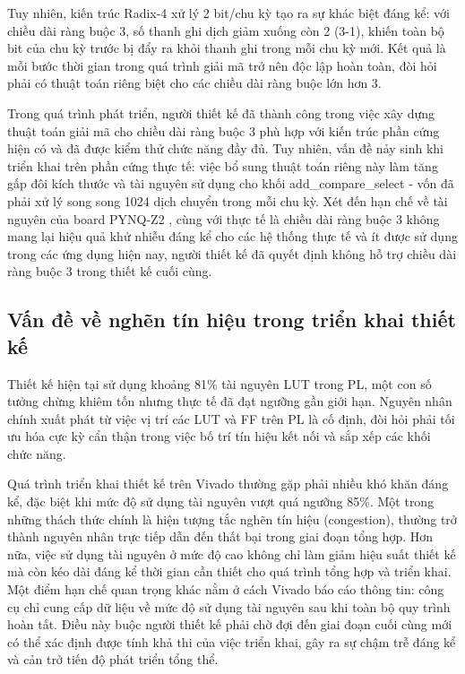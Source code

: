 \documentclass[../DoAn.tex]{subfiles}
\begin{document}
Tuy nhiên, kiến trúc Radix-4 xử lý 2 bit/chu kỳ tạo ra sự khác biệt đáng kể: với chiều dài ràng buộc 3, số thanh ghi dịch giảm xuống còn 2 (3-1), khiến toàn bộ bit của chu kỳ trước bị đẩy ra khỏi thanh ghi trong mỗi chu kỳ mới. Kết quả là mỗi bước thời gian trong quá trình giải mã trở nên độc lập hoàn toàn, đòi hỏi phải có thuật toán riêng biệt cho các chiều dài ràng buộc lớn hơn 3. 

Trong quá trình phát triển, người thiết kế đã thành công trong việc xây dựng thuật toán giải mã cho chiều dài ràng buộc 3 phù hợp với kiến trúc phần cứng hiện có và đã được kiểm thử chức năng đầy đủ. Tuy nhiên, vấn đề nảy sinh khi triển khai trên phần cứng thực tế: việc bổ sung thuật toán riêng này làm tăng gấp đôi kích thước và tài nguyên sử dụng cho khối add\_compare\_select - vốn đã phải xử lý song song 1024 dịch chuyển trong mỗi chu kỳ. Xét đến hạn chế về tài nguyên của board PYNQ-Z2 \cite{noauthor_aup_nodate}, cùng với thực tế là chiều dài ràng buộc 3 không mang lại hiệu quả khử nhiễu đáng kể cho các hệ thống thực tế và ít được sử dụng trong các ứng dụng hiện nay, người thiết kế đã quyết định không hỗ trợ chiều dài ràng buộc 3 trong thiết kế cuối cùng.


\subsection{Vấn đề về nghẽn tín hiệu trong triển khai thiết kế}
\label{subsection:signal_congestion}

Thiết kế hiện tại sử dụng khoảng 81\% tài nguyên LUT trong PL, một con số tưởng chừng khiêm tốn nhưng thực tế đã đạt ngưỡng gần giới hạn. Nguyên nhân chính xuất phát từ việc vị trí các LUT và FF trên PL là cố định, đòi hỏi phải tối ưu hóa cực kỳ cẩn thận trong việc bố trí tín hiệu kết nối và sắp xếp các khối chức năng.

Quá trình triển khai thiết kế trên Vivado thường gặp phải nhiều khó khăn đáng kể, đặc biệt khi mức độ sử dụng tài nguyên vượt quá ngưỡng 85\%. Một trong những thách thức chính là hiện tượng tắc nghẽn tín hiệu (congestion), thường trở thành nguyên nhân trực tiếp dẫn đến thất bại trong giai đoạn tổng hợp. Hơn nữa, việc sử dụng tài nguyên ở mức độ cao không chỉ làm giảm hiệu suất thiết kế mà còn kéo dài đáng kể thời gian cần thiết cho quá trình tổng hợp và triển khai. Một điểm hạn chế quan trọng khác nằm ở cách Vivado báo cáo thông tin: công cụ chỉ cung cấp dữ liệu về mức độ sử dụng tài nguyên sau khi toàn bộ quy trình hoàn tất. Điều này buộc người thiết kế phải chờ đợi đến giai đoạn cuối cùng mới có thể xác định được tính khả thi của việc triển khai, gây ra sự chậm trễ đáng kể và cản trở tiến độ phát triển tổng thể.
\end{document}
